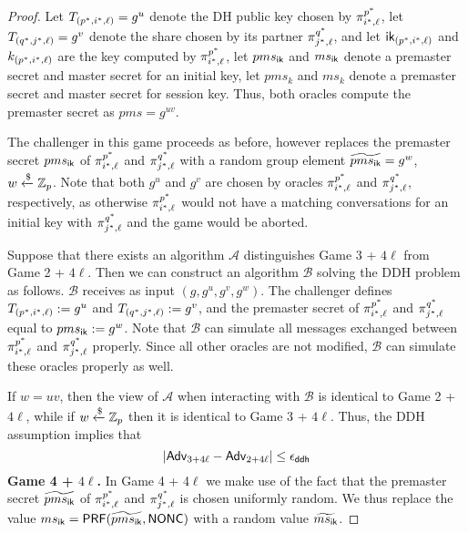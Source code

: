 \begin{proof}
 Let $T_{(p^{\ast}, i^{\ast}, \ell)} = g^u$ denote the DH public key chosen by $\pi^{p^{\ast}}_{i^{\ast},\ell}$, let $T_{(q^{\ast}, j^{\ast}, \ell)} = g^v$ denote the share chosen by its partner $\pi^{q^{\ast}}_{j^{\ast},\ell}$, and let $\mathsf{ik}_{(p^{\ast}, i^{\ast}, \ell)}$ and $k_{(p^{\ast}, i^{\ast}, \ell)}$ are the key computed by $\pi^{p^{\ast}}_{i^{\ast},\ell}$, let $pms_{\mathsf{ik}}$ and $ms_{\mathsf{ik}}$ denote a premaster secret and master secret for an initial key, let $pms_{k}$ and $ms_{k}$ denote a premaster secret and master secret for session key. Thus, both oracles compute the premaster secret as $pms = g^{uv}$.

 The challenger in this game proceeds as before, however replaces the premaster secret $pms_{\mathsf{ik}}$ of $\pi^{p^{\ast}}_{i^{\ast},\ell}$ and $\pi^{q^{\ast}}_{j^{\ast},\ell}$ with a random group element $\widetilde{pms_{\mathsf{ik}}} = g^w$, $w \xleftarrow{\$} \mathbb{Z}_p$. Note that both $g^u$ and $g^v$ are chosen by oracles $\pi^{p^{\ast}}_{i^{\ast},\ell}$ and $\pi^{q^{\ast}}_{j^{\ast},\ell}$, respectively, as otherwise $\pi^{p^{\ast}}_{i^{\ast},\ell}$ would not have a matching conversations for an initial key with $\pi^{q^{\ast}}_{j^{\ast},\ell}$ and the game would be aborted.

 Suppose that there exists an algorithm $\mathcal{A}$ distinguishes Game 3 + $4\ell$ from Game 2 + $4\ell$. Then we can construct an algorithm $\mathcal{B}$ solving the DDH problem as follows. $\mathcal{B}$ receives as input $(g,g^u,g^v,g^w)$. The challenger defines $T_{(p^{\ast}, i^{\ast}, \ell)} := g^u$ and $T_{(q^{\ast}, j^{\ast}, \ell)} := g^v$, and the premaster secret of $\pi^{p^{\ast}}_{i^{\ast},\ell}$ and $\pi^{q^{\ast}}_{j^{\ast},\ell}$ equal to $pms_{\mathsf{ik}} := g^w$. Note that $\mathcal{B}$ can simulate all messages exchanged between $\pi^{p^{\ast}}_{i^{\ast},\ell}$ and $\pi^{q^{\ast}}_{j^{\ast},\ell}$ properly. Since all other oracles are not modified, $\mathcal{B}$ can simulate these oracles properly as well.

 If $w=uv$, then the view of $\mathcal{A}$ when interacting with $\mathcal{B}$ is identical to Game 2 + $4\ell$, while if $w \xleftarrow{\$}\mathbb{Z}_p$ then it is identical to Game 3 + $4\ell$. Thus, the DDH assumption implies that
 \begin{equation}
  |\mathsf{Adv}_{3 + 4\ell} - \mathsf{Adv}_{2 + 4\ell}| \leq \epsilon_{\mathsf{ddh}}
 \end{equation}%
%
%
 \textbf{Game 4 + $4\ell$.} In Game 4 + 4$\ell$ we make use of the fact that the premaster secret $\widetilde{pms_{\mathsf{ik}}}$ of $\pi^{p^{\ast}}_{i^{\ast},\ell}$ and $\pi^{q^{\ast}}_{j^{\ast},\ell}$ is chosen uniformly random. We thus replace the value $ms_{\mathsf{ik}} = \mathsf{PRF}(\widetilde{pms_{\mathsf{ik}}}, \mathsf{NONC})$ with a random value $\widetilde{ms_{\mathsf{ik}}}$.


\end{proof}
